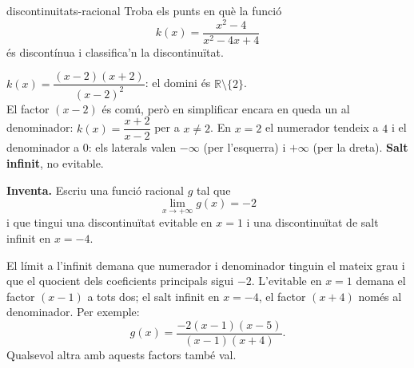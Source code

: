 \begin{apartats}
\begin{tria}{discontinuitats-racional}
Troba els punts en què la funció
\[
k(x)=\frac{x^2-4}{x^2-4x+4}
\]
és discontínua i classifica'n la discontinuïtat.

\begin{solucio}
$k(x)=\dfrac{(x-2)(x+2)}{(x-2)^2}$: el domini és $\mathbb{R}\setminus\{2\}$.\\
El factor $(x-2)$ és comú, però en simplificar encara en queda un al denominador:
$k(x)=\dfrac{x+2}{x-2}$ per a $x\ne2$. En $x=2$ el numerador tendeix a $4$ i el denominador a
$0$: els laterals valen $-\infty$ (per l'esquerra) i $+\infty$ (per la dreta).
\textbf{Salt infinit}, no evitable.
\end{solucio}
\end{tria}

\begin{nomesllarg}
\textbf{Inventa.} Escriu una funció racional $g$ tal que
\[
\lim_{x\to+\infty}g(x)=-2
\]
i que tingui una discontinuïtat evitable en $x=1$ i una discontinuïtat de salt infinit en
$x=-4$.

\begin{solucio}
El límit a l'infinit demana que numerador i denominador tinguin el mateix grau i que el
quocient dels coeficients principals sigui $-2$. L'evitable en $x=1$ demana el factor $(x-1)$
a tots dos; el salt infinit en $x=-4$, el factor $(x+4)$ només al denominador. Per exemple:
\[
g(x)=\frac{-2(x-1)(x-5)}{(x-1)(x+4)} .
\]
Qualsevol altra amb aquests factors també val.
\end{solucio}
\end{nomesllarg}

\end{apartats}

